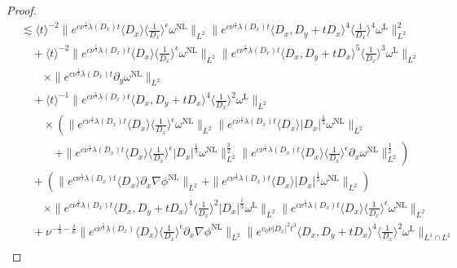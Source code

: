 \documentclass[reqno, 12pt]{amsart} %
\theoremstyle{plain} %
\theoremstyle{definition}
\theoremstyle{remark}
\numberwithin{equation}{section} %
\newcommand{\lt}{\left}
\newcommand{\rt}{\right}
\newcommand{\px}{\partial_x}
\newcommand{\py}{\partial_y}
\begin{document}
\begin{proof}
{\begin{align*}
				&\lesssim \langle t\rangle^{-2} \|e^{c \nu^{\frac{1}{3}} \lambda\left(D_x\right) t}\langle D_x\rangle  \langle \frac{1}{D_x}\rangle^\epsilon \omega^{\mathrm{NL}}\|_{L^2}    \|e^{c \nu^{\frac{1}{3}} \lambda\left(D_x\right) t}\langle D_x, D_y + tD_x\rangle^4\langle\frac{1}{D_x}\rangle^4 \omega^{\mathrm{L}} \|_{L^2}^2 \\
				&\quad +  \langle t\rangle^{-2} \|e^{c \nu^{\frac{1}{3}} \lambda\left(D_x\right) t}\langle D_x\rangle  \langle \frac{1}{D_x}\rangle^\epsilon \omega^{\mathrm{NL}}\|_{L^2}    \|e^{c \nu^{\frac{1}{3}} \lambda\left(D_x\right) t}\langle D_x, D_y + tD_x\rangle^ 5 \langle\frac{1}{D_x}\rangle^3 \omega^{\mathrm{L}} \|_{L^2} \\
				&\qquad \times \|e^{c \nu^{\frac{1}{3}} \lambda\left(D_x\right) t} \py \omega^{\mathrm{NL}} \|_{L^2} \\
				&\quad +  \langle t\rangle^{-1}     \|e^{c \nu^{\frac{1}{3}} \lambda\left(D_x\right) t}\langle D_x, D_y+t D_x\rangle^4\langle\frac{1}{D_x}\rangle^2 \omega^{\mathrm{L}}\|_{L^2} \\
				& \qquad \times \left(\|e^{c \nu^{\frac{1}{3}} \lambda\left(D_x\right) t}\langle D_x\rangle\langle\frac{1}{D_x}\rangle^\epsilon \omega^{\mathrm{NL}}\|_{L^2}  \| e^{c \nu^{\frac{1}{3}} \lambda\left(D_x\right) t} \langle D_x \rangle
				\left|D_x\right|^{\frac{1}{3}}  \omega^{\mathrm{NL}} \|_{L^2} \rt.\\
				&\qquad \quad  \lt.+ \|e^{c \nu^{\frac{1}{3}} \lambda\left(D_x\right) t}\langle D_x\rangle\langle\frac{1}{D_x}\rangle^\epsilon\left|D_x\right|^{\frac{1}{3}}  \omega^{\mathrm{NL}}\|_{L^2}^{\frac{3}{2}}   \|e^{c \nu^{\frac{1}{3}} \lambda\left(D_x\right) t}\langle D_x\rangle\langle\frac{1}{D_x}\rangle^\epsilon \px \omega^{\mathrm{NL}}\|_{L^2}^{\frac{1}{2}}\right) \\
				&\quad+  \lt( \|e^{c \nu^{\frac{1}{3}} \lambda\left(D_x\right) t}\langle D_x\rangle \partial_x \nabla \phi^{\mathrm{NL}}\|_{L^2} + \|e^{c \nu^{\frac{1}{3}} \lambda\left(D_x\right) t}\langle D_x\rangle\left|D_x\right|^{\frac{1}{3}} \omega^{\mathrm{NL}}\|_{L^2} \rt) \\
				&  \qquad \times\|e^{c \nu^{\frac{1}{3}} \lambda\left(D_x\right) t}\langle D_x, D_y+t D_x\rangle^4\langle\frac{1}{D_x}\rangle^2\left|D_x\right|^{\frac{1}{3}} \omega^{\mathrm{L}}\|_{L^2} \|e^{c \nu^{\frac{1}{3}} \lambda\left(D_x\right) t}\langle D_x\rangle  \langle\frac{1}{D_x}\rangle^\epsilon \omega^{\mathrm{NL}}\|_{L^2} \\
				& \quad  + \nu^{-\frac{1}{3}-\frac{\delta}{6}}\|e^{c \nu^{\frac{1}{3}} \lambda\left(D_x\right)}\langle D_x\rangle\langle\frac{1}{D_x}\rangle^\epsilon \partial_x \nabla \phi^{\mathrm{NL}}\|_{L^2}\|e^{c_0 \nu\left|D_x\right|^2 t^3}\langle D_x, D_y+t D_x\rangle^4\langle\frac{1}{D_x}\rangle^2 \omega^{\mathrm{L}}\|_{L^1 \cap L^2} \\

\end{align*}}
\end{proof}
\end{document}
